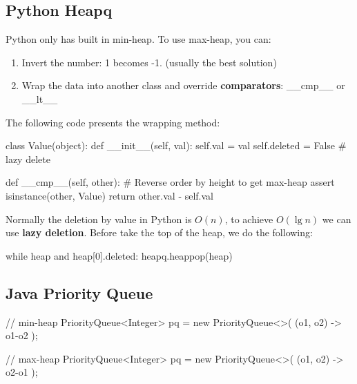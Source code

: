 \subsection{Python Heapq}
Python only has built in min-heap. To use max-heap, you can: 
\begin{enumerate}
\item Invert the number: 1 becomes -1.
(usually the best solution)\item Wrap the data into another class and override \textbf{comparators}: \_\_cmp\_\_ or \_\_lt\_\_
\end{enumerate}

The following code presents the wrapping method:
\begin{python}
class Value(object):
    def __init__(self, val):
        self.val = val
        self.deleted = False  # lazy delete 

    def __cmp__(self, other):
        # Reverse order by height to get max-heap
        assert isinstance(other, Value)
        return other.val - self.val
\end{python}

Normally the deletion by value in Python is $O(n)$, to achieve $O(\lg n)$ we can use \textbf{lazy deletion}. Before take the top of the heap, we do the following:
\begin{python}
while heap and heap[0].deleted:
    heapq.heappop(heap)
\end{python}
\subsection{Java Priority Queue}
\begin{java}
// min-heap
PriorityQueue<Integer> pq = new PriorityQueue<>(
    (o1, o2) -> o1-o2
);

// max-heap
PriorityQueue<Integer> pq = new PriorityQueue<>(
    (o1, o2) -> o2-o1
);
\end{java}
